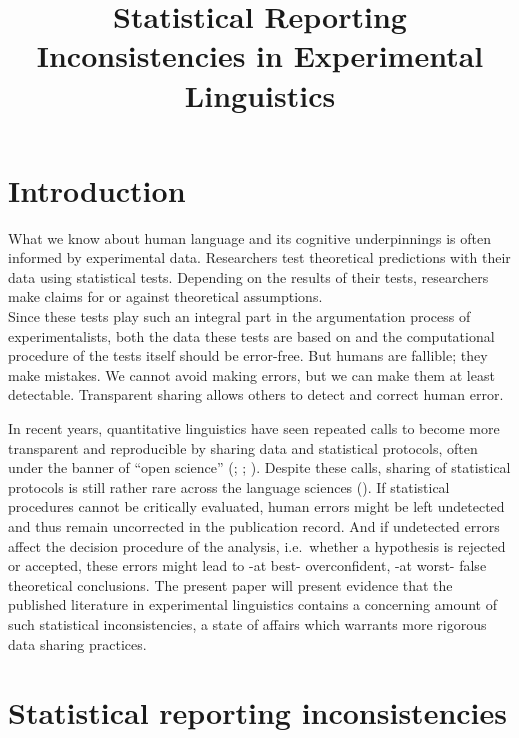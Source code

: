 \documentclass[
  doc,
  longtable,
  nolmodern,
  notxfonts,
  notimes,
  colorlinks=true,linkcolor=blue,citecolor=blue,urlcolor=blue]{apa7}
\title{Statistical Reporting Inconsistencies in Experimental
Linguistics}
\affiliation{
{Department of Linguistics \& Scandinavian Studies, University of Oslo}}
\begin{document}
\maketitle


\setcounter{secnumdepth}{5}

\setlength\LTleft{0pt}


\section{Introduction}\label{introduction}

What we know about human language and its cognitive underpinnings is
often informed by experimental data. Researchers test theoretical
predictions with their data using statistical tests. Depending on the
results of their tests, researchers make claims for or against
theoretical assumptions.\\
Since these tests play such an integral part in the argumentation
process of experimentalists, both the data these tests are based on and
the computational procedure of the tests itself should be error-free.
But humans are fallible; they make mistakes. We cannot avoid making
errors, but we can make them at least detectable. Transparent sharing
allows others to detect and correct human error.

In recent years, quantitative linguistics have seen repeated calls to
become more transparent and reproducible by sharing data and statistical
protocols, often under the banner of ``open science''
(;
;
). Despite these
calls, sharing of statistical protocols is still rather rare across the
language sciences (). If statistical procedures cannot be critically evaluated,
human errors might be left undetected and thus remain uncorrected in the
publication record. And if undetected errors affect the decision
procedure of the analysis, i.e.~whether a hypothesis is rejected or
accepted, these errors might lead to -at best- overconfident, -at worst-
false theoretical conclusions. The present paper will present evidence
that the published literature in experimental linguistics contains a
concerning amount of such statistical inconsistencies, a state of
affairs which warrants more rigorous data sharing practices.

\section{Statistical reporting
inconsistencies}\label{statistical-reporting-inconsistencies}
\end{document}
